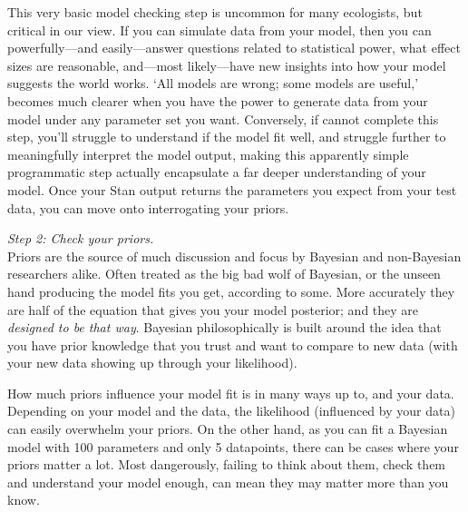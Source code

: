 \documentclass[11pt]{article}
\begin{document}
{This very basic model checking step is uncommon for many ecologists, but critical in our view. If you can simulate data from your model, then you can powerfully---and easily---answer questions related to statistical power, what effect sizes are reasonable, and---most likely---have new insights into how your model suggests the world works. `All models are wrong; some models are useful,' becomes much clearer when you have the power to generate data from your model under any parameter set you want. Conversely, if cannot complete this step, you'll struggle to understand if the model fit well, and struggle further to meaningfully interpret the model output, making this apparently simple programmatic step actually encapsulate a far deeper understanding of your model. Once your \textsf{Stan} output returns the parameters you expect from your test data, you can move onto interrogating your priors. 

\emph{Step 2: Check your priors.} \\
Priors are the source of much discussion and focus by Bayesian and non-Bayesian researchers alike. Often treated as the big bad wolf of Bayesian, or the unseen hand producing the model fits you get, according to some. More accurately they are half of the equation that gives you your model posterior; and they are \emph{designed to be that way}.
Bayesian philosophically is built around the idea that you have prior knowledge that you trust and want to compare to new data (with your new data showing up through your likelihood).

How much priors influence your model fit is in many ways up to, and your data. Depending on your model and the data, the likelihood (influenced by your data) can easily overwhelm your priors.  On the other hand, as you can fit a Bayesian model with 100 parameters and only 5 datapoints, there can be cases where your priors matter a lot. Most dangerously, failing to think about them, check them and understand your model enough, can mean they may matter more than you know. %

}
\end{document}
